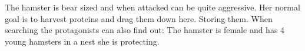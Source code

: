 \begin{npcBox}[title=Hamster]
    \begin{consequences}
    \item {}
    \item {}
    \item {}
    \end{consequences}

    \begin{npcDescription}
    The hamster is bear sized and when attacked can be quite aggressive. Her normal goal is to harvest proteins and drag them down here. Storing them. When searching the protagonists can also find out: The hamster is female and has 4 young hamsters in a nest she is protecting.
    \end{npcDescription}

\end{npcBox}


